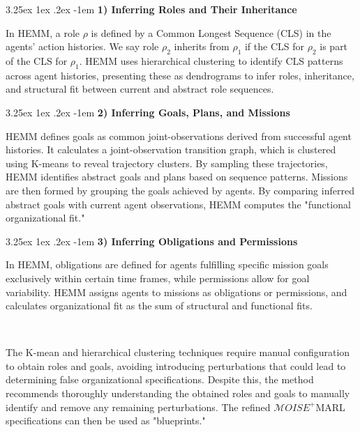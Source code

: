 \documentclass[conference]{IEEEtran}
\makeatletter
\renewcommand\paragraph{\@startsection{paragraph}{5}{\z@}%
  {3.25ex \@plus1ex \@minus.2ex}%
  {-1em}%
  {\normalfont\normalsize\bfseries}}
\makeatother
\begin{document}
\paragraph{\textbf{1) Inferring Roles and Their Inheritance}}

In HEMM, a role $\rho$ is defined by a Common Longest Sequence (CLS) in the agents' action histories. We say role $\rho_2$ inherits from $\rho_1$ if the CLS for $\rho_2$ is part of the CLS for $\rho_1$. HEMM uses hierarchical clustering to identify CLS patterns across agent histories, presenting these as dendrograms to infer roles, inheritance, and structural fit between current and abstract role sequences.

\paragraph{\textbf{2) Inferring Goals, Plans, and Missions}}

HEMM defines goals as common joint-observations derived from successful agent histories. It calculates a joint-observation transition graph, which is clustered using K-means to reveal trajectory clusters. By sampling these trajectories, HEMM identifies abstract goals and plans based on sequence patterns. Missions are then formed by grouping the goals achieved by agents. By comparing inferred abstract goals with current agent observations, HEMM computes the "functional organizational fit."

\paragraph{\textbf{3) Inferring Obligations and Permissions}}

In HEMM, obligations are defined for agents fulfilling specific mission goals exclusively within certain time frames, while permissions allow for goal variability. HEMM assigns agents to missions as obligations or permissions, and calculates organizational fit as the sum of structural and functional fits.


\

The K-mean and hierarchical clustering techniques require manual configuration to obtain roles and goals, avoiding introducing perturbations that could lead to determining false organizational specifications. Despite this, the method recommends thoroughly understanding the obtained roles and goals to manually identify and remove any remaining perturbations. The refined $\mathcal{M}OISE^+$MARL specifications can then be used as "blueprints."
\end{document}
